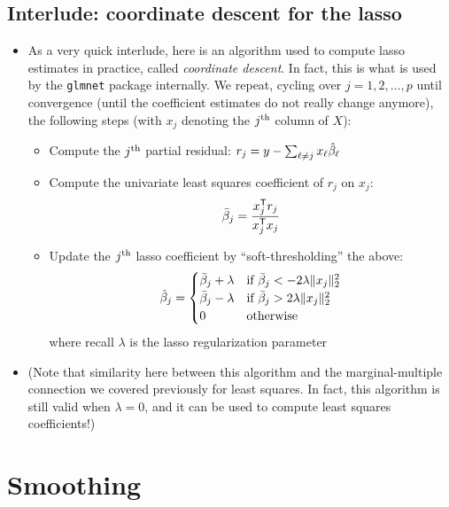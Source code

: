 \documentclass{article}
\begin{document}
\subsection{Interlude: coordinate descent for the lasso}

\begin{itemize}
\item As a very quick interlude, here is an algorithm used to compute lasso
  estimates in practice, called \emph{coordinate descent}. In fact, this is what
  is used by the \verb|glmnet| package internally. We repeat, cycling over 
  $j=1,2,\dots,p$ until convergence (until the coefficient estimates do not
  really change anymore), the following steps (with $x_j$ denoting the $j^{\textnormal{th}}$
  column of $X$): 

\begin{itemize}
\item Compute the $j^{\textnormal{th}}$ partial residual: $r_j = y - \sum_{\ell \not= j} x_\ell 
  \hat{\beta}_\ell$  

\item Compute the univariate least squares coefficient of $r_j$ on $x_j$: 
  \[
  \bar\beta_j = \frac{x_j^{\mathsf{T}} r_j}{x_j^{\mathsf{T}} x_j}
  \]

\item Update the $j^{\textnormal{th}}$ lasso coefficient by ``soft-thresholding'' the above: 
  \[
  \hat{\beta}_j = \begin{cases}
  \bar\beta_j + \lambda & \text{if $\bar\beta_j < -2\lambda \|x_j\|_2^2$} \\ 
  \bar\beta_j - \lambda & \text{if $\bar\beta_j > 2\lambda \|x_j\|_2^2$} \\
  0 & \text{otherwise}
  \end{cases}
  \]
  where recall $\lambda$ is the lasso regularization parameter 
\end{itemize}

\item (Note that similarity here between this algorithm and the
  marginal-multiple connection we covered previously for least squares. In 
  fact, this algorithm is still valid when $\lambda = 0$, and it can be used to 
  compute least squares coefficients!) 
\end{itemize}

\section{Smoothing}
\end{document}

